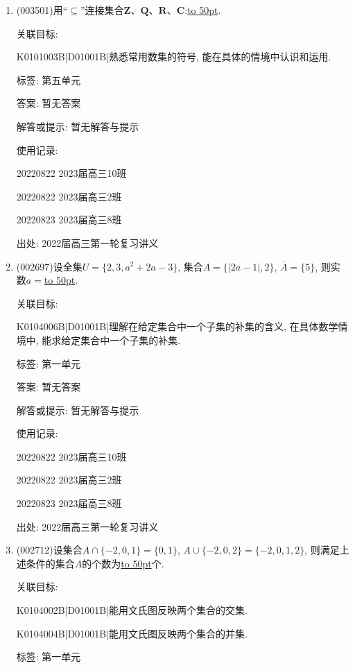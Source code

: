 \documentclass[10pt,a4paper]{article}
\newcommand{\blank}[1]{\underline{\hbox to #1pt{}}}
\begin{document}
\begin{enumerate}[1.]

\item { (003501)}用``$\subseteq$''连接集合$\mathbf{Z}$、$\mathbf{Q}$、$\mathbf{R}$、$\mathbf{C}$:\blank{50}.


关联目标:

K0101003B|D01001B|熟悉常用数集的符号, 能在具体的情境中认识和运用.



标签: 第五单元

答案: 暂无答案

解答或提示: 暂无解答与提示

使用记录:

20220822	2023届高三10班	

20220822	2023届高三2班	

20220823	2023届高三8班	


出处: 2022届高三第一轮复习讲义
\item { (002697)}设全集$U=\{2,3,a^2+2a-3\}$, 集合$A=\{|2a-1|,2\}$, $\overline A=\{5\}$, 则实数$a=$\blank{50}.


关联目标:

K0104006B|D01001B|理解在给定集合中一个子集的补集的含义, 在具体数学情境中, 能求给定集合中一个子集的补集.



标签: 第一单元

答案: 暂无答案

解答或提示: 暂无解答与提示

使用记录:

20220822	2023届高三10班	

20220822	2023届高三2班	

20220823	2023届高三8班	


出处: 2022届高三第一轮复习讲义
\item { (002712)}设集合$A\cap \{-2,0,1\}=\{0,1\}$, $A\cup \{-2,0,2\}=\{-2,0,1,2\}$, 则满足上述条件的集合$A$的个数为\blank{50}个.


关联目标:

K0104002B|D01001B|能用文氏图反映两个集合的交集.

K0104004B|D01001B|能用文氏图反映两个集合的并集.



标签: 第一单元


\end{enumerate}
\end{document}
